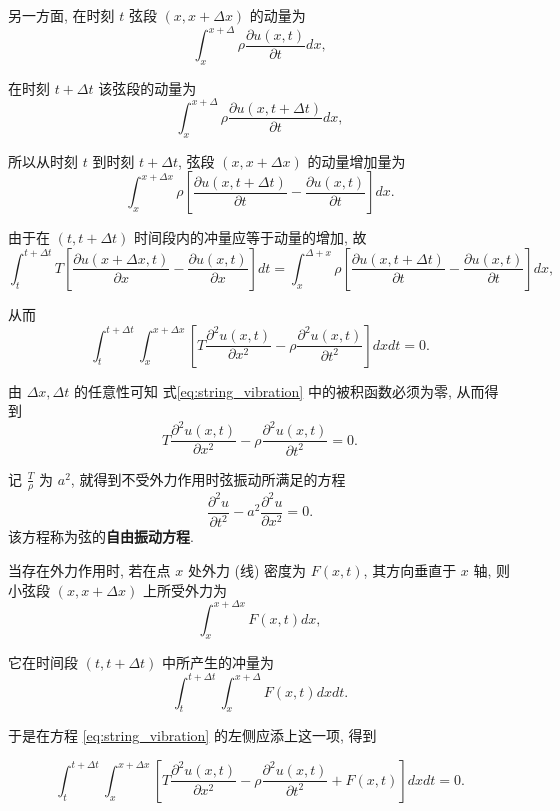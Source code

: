 另一方面, 在时刻 $t$ 弦段 $(x, x+\Delta x)$ 的动量为
$$
\int_x^{x+\Delta} \rho \frac{\partial u(x, t)}{\partial t} d x,
$$

在时刻 $t+\Delta t$ 该弦段的动量为
$$
\int_x^{x+\Delta} \rho \frac{\partial u(x, t+\Delta t)}{\partial t} d x,
$$

所以从时刻 $t$ 到时刻 $t+\Delta t$, 弦段 $(x, x+\Delta x)$ 的动量增加量为
$$
\int_x^{x+\Delta x} \rho\left[\frac{\partial u(x, t+\Delta t)}{\partial t}-\frac{\partial u(x, t)}{\partial t}\right] d x .
$$

由于在 $(t, t+\Delta t)$ 时间段内的冲量应等于动量的增加, 故
$$
\int_t^{t+\Delta t} T\left[\frac{\partial 
u(x+\Delta x, t)}{\partial x}-\frac{\partial u(x, t)}{\partial x}\right] d t
=\int_{x}^{\Delta+x} \rho\left[\frac{\partial u(x, t+\Delta t)}{\partial t}-
\frac{\partial u(x, t)}{\partial t}\right] d x,
$$

从而
\begin{equation}
\int_t^{t+\Delta t} \int_{x}^{x+ \Delta x} 
\left[T \frac{\partial^2 u(x, t)}{\partial x^2}-\rho 
\frac{\partial^2 u(x, t)}{\partial t^2}\right] d x d t=0 .
\label{eq:string_vibration}
\end{equation}

由 $\Delta x, \Delta t$ 的任意性可知 式\eqref{eq:string_vibration} 中的被积函数必须为零, 从而得到
\begin{equation}
T \frac{\partial^2 u(x, t)}{\partial x^2}-\rho \frac{\partial^2 u(x, t)}{\partial t^2}=0 .
\end{equation}


记 $\frac{T}{\rho}$ 为 $a^2$, 就得到不受外力作用时弦振动所满足的方程
\begin{equation}
\frac{\partial^2 u}{\partial t^2}-a^2 \frac{\partial^2 u}{\partial x^2}=0 .
\label{eq:free_vibration}
\end{equation}
该方程称为弦的\textbf{自由振动方程}.

当存在外力作用时, 若在点 $x$ 处外力 (线) 密度为 $F(x, t)$, 其方向垂直于 $x$ 轴, 则小弦段 $(x, x+\Delta x)$ 上所受外力为
$$
\int_x^{x+\Delta x} F(x, t) d x,
$$

它在时间段 $(t, t+\Delta t)$ 中所产生的冲量为
$$
\int_t^{t+\Delta t} \int_x^{x+\Delta } F(x, t) d x d t .
$$

于是在方程 \eqref{eq:string_vibration} 的左侧应添上这一项, 得到

$$
\int_t^{t+\Delta t} \int_{x}^{x+ \Delta x}  \left[T \frac{\partial^2 u(x, t)}{\partial x^2}-\rho \frac{\partial^2 u(x, t)}{\partial t^2}+F(x, t)\right] d x d t=0 .
$$

